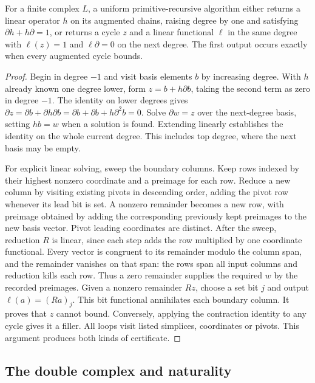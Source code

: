 \begin{lemma}\label{lem:contraction-producer}
For a finite complex $L$, a uniform primitive-recursive algorithm either
returns a linear operator $h$ on its augmented chains, raising degree by
one and satisfying $\partial h+h\partial=1$, or returns a cycle $z$ and a
linear functional $\ell$ in the same degree with $\ell(z)=1$ and
$\ell\partial=0$ on the next degree. The first output occurs exactly
when every augmented cycle bounds.
\end{lemma}
\begin{proof}
Begin in degree $-1$ and visit basis elements $b$ by increasing degree.
With $h$ already known one degree lower, form $z=b+h\partial b$,
taking the second term as zero in degree $-1$. The identity on lower
degrees gives
$\partial z=\partial b+\partial h\partial b
=\partial b+\partial b+h\partial^2 b=0$.
Solve $\partial w=z$ over the next-degree basis, setting $h b=w$
when a solution is found. Extending linearly establishes the identity
on the whole current degree. This includes top degree, where the next
basis may be empty.

For explicit linear solving, sweep the boundary columns. Keep rows indexed
by their highest nonzero coordinate and a preimage for each row. Reduce
a new column by visiting existing pivots in descending order, adding the
pivot row whenever its lead bit is set. A nonzero remainder becomes a new
row, with preimage obtained by adding the corresponding previously kept
preimages to the new basis vector. Pivot leading coordinates are distinct.
After the sweep, reduction $R$ is linear, since each step adds the row
multiplied by one coordinate functional. Every vector is congruent to its
remainder modulo the column span, and the remainder vanishes on that span:
the rows span all input columns and reduction kills each row. Thus a zero
remainder supplies the required $w$ by the recorded preimages. Given a
nonzero remainder $Rz$, choose a set bit $j$ and output
$\ell(a)=(Ra)_j$. This bit functional annihilates each boundary column.
It proves that $z$ cannot bound. Conversely, applying the contraction
identity to any cycle gives it a filler. All loops visit listed simplices,
coordinates or pivots. This argument produces both kinds of certificate.
\end{proof}

\subsection{The double complex and naturality}

